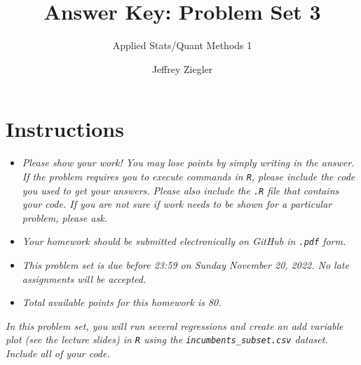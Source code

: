 \documentclass[12pt,letterpaper]{article}
\title{Answer Key: Problem Set 3}
\date{Jeffrey Ziegler}
\author{Applied Stats/Quant Methods 1}
\begin{document}
	\maketitle
	
	\section*{Instructions}
	\begin{itemize}
		\item \textit{Please show your work! You may lose points by simply writing in the answer. If the problem requires you to execute commands in \texttt{R}, please include the code you used to get your answers. Please also include the \texttt{.R} file that contains your code. If you are not sure if work needs to be shown for a particular problem, please ask.}
		\item \textit{Your homework should be submitted electronically on GitHub in \texttt{.pdf} form.}
		\item \textit{This problem set is due before 23:59 on Sunday November 20, 2022. No late assignments will be accepted.}
		\item \textit{Total available points for this homework is 80.}
	\end{itemize}
	\vspace{.25cm}
	
	\noindent \emph{In this problem set, you will run several regressions and create an add variable plot (see the lecture slides) in \texttt{R} using the \texttt{incumbents\_subset.csv} dataset. Include all of your code.}
	
	\vspace{.5cm}
\end{document}
